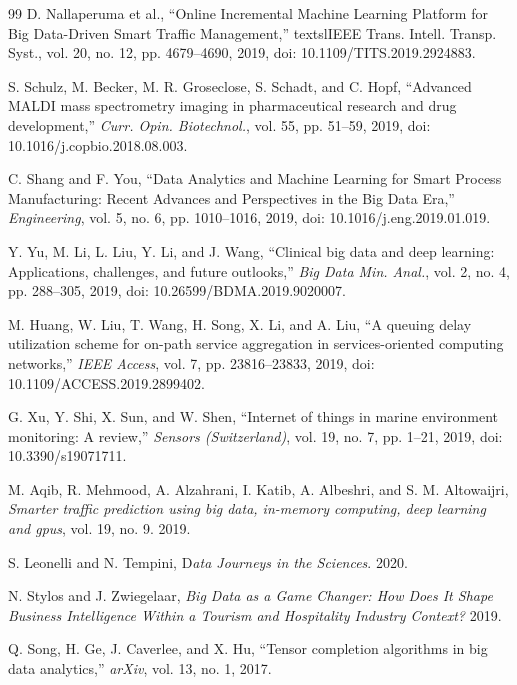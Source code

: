 \documentclass{telkomnika}
\begin{document}
\begin{thebibliography} {99}
 D. Nallaperuma et al., “Online Incremental Machine Learning Platform for Big Data-Driven Smart Traffic Management,” textsl{IEEE Trans. Intell. Transp. Syst.}, vol. 20, no. 12, pp. 4679–4690, 2019, doi: 10.1109/TITS.2019.2924883.

 S. Schulz, M. Becker, M. R. Groseclose, S. Schadt, and C. Hopf, “Advanced MALDI mass spectrometry imaging in pharmaceutical research and drug development,” \textsl{Curr. Opin. Biotechnol.}, vol. 55, pp. 51–59, 2019, doi: 10.1016/j.copbio.2018.08.003.

 C. Shang and F. You, “Data Analytics and Machine Learning for Smart Process Manufacturing: Recent Advances and Perspectives in the Big Data Era,” \textsl{Engineering}, vol. 5, no. 6, pp. 1010–1016, 2019, doi: 10.1016/j.eng.2019.01.019.

 Y. Yu, M. Li, L. Liu, Y. Li, and J. Wang, “Clinical big data and deep learning: Applications, challenges, and future outlooks,” \textsl{Big Data Min. Anal.}, vol. 2, no. 4, pp. 288–305, 2019, doi: 10.26599/BDMA.2019.9020007.

 M. Huang, W. Liu, T. Wang, H. Song, X. Li, and A. Liu, “A queuing delay utilization scheme for on-path service aggregation in services-oriented computing networks,” \textsl{IEEE Access}, vol. 7, pp. 23816–23833, 2019, doi: 10.1109/ACCESS.2019.2899402.

 G. Xu, Y. Shi, X. Sun, and W. Shen, “Internet of things in marine environment monitoring: A review,” \textsl{Sensors (Switzerland)}, vol. 19, no. 7, pp. 1–21, 2019, doi: 10.3390/s19071711.

 M. Aqib, R. Mehmood, A. Alzahrani, I. Katib, A. Albeshri, and S. M. Altowaijri, \textsl{Smarter traffic prediction using big data, in-memory computing, deep learning and gpus}, vol. 19, no. 9. 2019.

 S. Leonelli and N. Tempini, D\textsl{ata Journeys in the Sciences}. 2020.

 N. Stylos and J. Zwiegelaar, \textsl{Big Data as a Game Changer: How Does It Shape Business Intelligence Within a Tourism and Hospitality Industry Context?} 2019.

 Q. Song, H. Ge, J. Caverlee, and X. Hu, “Tensor completion algorithms in big data analytics,” \textsl{arXiv}, vol. 13, no. 1, 2017.

\end{thebibliography}

\newpage
\end{document}

